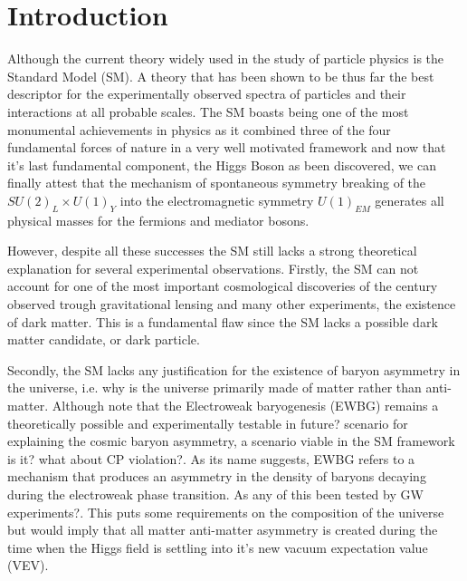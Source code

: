 
\newpage

\section{Introduction}

Although the current theory widely used in the study of particle physics is the Standard Model (SM). A theory that has been shown to be thus far the best descriptor for the experimentally observed spectra of particles and their interactions at all probable scales. The SM boasts being one of the most monumental achievements in physics as it combined three of the four fundamental forces of nature in a very well motivated framework and now that it's last fundamental component, the Higgs Boson as been discovered, we can finally attest that the mechanism of spontaneous symmetry breaking of the $SU(2)_L \times U(1)_Y$ into the electromagnetic symmetry $U(1)_{EM}$ generates all physical masses for the fermions and mediator bosons. 

However, despite all these successes the SM still lacks a strong theoretical explanation for several experimental observations. Firstly, the SM can not account for one of the most important cosmological discoveries of the century observed trough gravitational lensing and many other experiments, the existence of dark matter. This is a fundamental flaw since the SM lacks a possible dark matter candidate, or dark particle. 

Secondly, the SM lacks any justification for the existence of baryon asymmetry in the universe, i.e. why is the universe primarily made of matter rather than anti-matter. Although note that the Electroweak  baryogenesis (EWBG) remains a theoretically possible and experimentally testable {\color{blue} in future?} scenario for explaining the cosmic baryon asymmetry, a scenario viable in the SM framework {\color{blue} is it? what about CP violation?}. As its name suggests, EWBG refers to a mechanism that produces an asymmetry in the density of baryons decaying during the electroweak phase transition. {\color{red} As any of this been tested by GW experiments?}. This puts some requirements on the composition of the universe but would imply that all matter anti-matter asymmetry is created during the time when the Higgs field is settling into it's new vacuum expectation value (VEV). 

